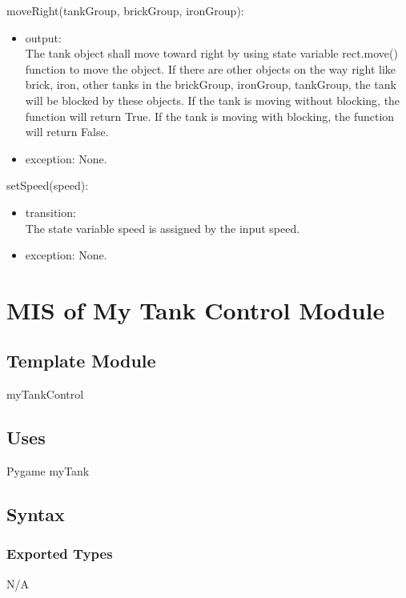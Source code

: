 \documentclass[12pt, titlepage]{article}
\begin{document}
        moveRight(tankGroup, brickGroup, ironGroup):
		\begin{itemize}
		\item output: \\
		The tank object shall move toward right by using state variable rect.move() function to move the object. If there are other objects on the way right like brick, iron, other tanks in the brickGroup, ironGroup, tankGroup, the tank will be blocked by these objects. If the tank is moving without blocking, the function will return True. If the tank is moving with blocking, the function will return False.
		
		\item exception: None.
        \end{itemize}
        
        setSpeed(speed):
		\begin{itemize}
		\item transition: \\
		The state variable speed is assigned by the input speed.
		
		\item exception: None.
        \end{itemize}
        

\section{MIS of My Tank Control Module}
        \subsection{Template Module}
        myTankControl
        \subsection{Uses}
        Pygame
        myTank
		\subsection{Syntax}
		\subsubsection{Exported Types}
		N/A
\end{document}
